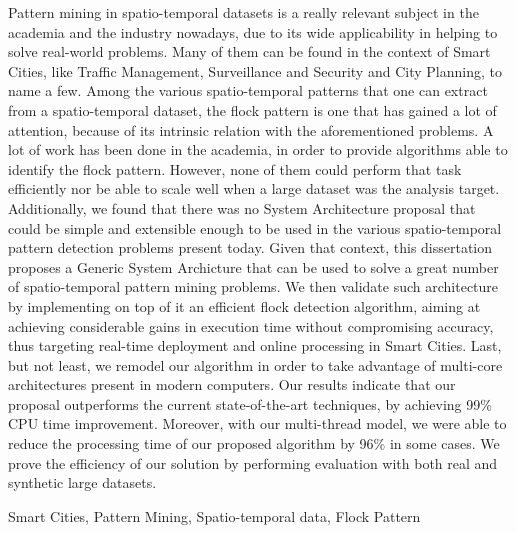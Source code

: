 Pattern mining in spatio-temporal datasets is a really relevant subject in the academia and the industry nowadays, due
to its wide applicability in helping to solve real-world problems. Many of them can be found in the context of Smart
Cities, like Traffic Management, Surveillance and Security and City Planning, to name a few. Among the various
spatio-temporal patterns that one can extract from a spatio-temporal dataset, the flock pattern is one that has gained a
lot of attention, because of its intrinsic relation with the aforementioned problems. A lot of work has been done in the
academia, in order to provide algorithms able to identify the flock pattern. However, none of them could perform that
task efficiently nor be able to scale well when a large dataset was the analysis target. Additionally, we found that
there was no System Architecture proposal that could be simple and extensible enough to be used in the various
spatio-temporal pattern detection problems present today. Given that context, this dissertation proposes a Generic
System Archicture that can be used to solve a great number of spatio-temporal pattern mining problems. We then validate
such architecture by implementing on top of it an efficient flock detection algorithm, aiming at achieving considerable
gains in execution time without compromising accuracy, thus targeting real-time deployment and online processing in
Smart Cities. Last, but not least, we remodel our algorithm in order to take advantage of multi-core architectures
present in modern computers. Our results indicate that our proposal outperforms the current state-of-the-art techniques,
by achieving 99\% CPU time improvement. Moreover, with our multi-thread model, we were able to reduce the processing
time of our proposed algorithm by 96\% in some cases. We prove the efficiency of our solution by performing evaluation
with both real and synthetic large datasets.

\begin{keywords}
Smart Cities, Pattern Mining, Spatio-temporal data, Flock Pattern
\end{keywords}
